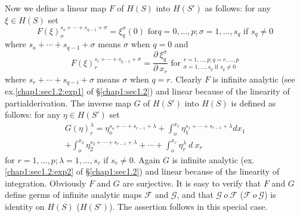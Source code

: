 Now we define a linear map $F$ of $H(S)$ into $H(S')$ as follows: for
any $\xi \in H(S)$ set 
$$
F(\xi)_o^{s_o + \cdots + s_{q-1} + \sigma} = \xi^\sigma_q (0) \text{ for
} q = 0,  \ldots,  p ; \sigma = 1,  \ldots,  s_q \text{ if } s_q \neq
0 
$$
where $s_o + \cdots + s_{q-1} + \sigma$ means $\sigma$ when $q = 0$ and 
$$
F(\xi)^{s_r + \cdots + s_{q-1} + \sigma}_r = \frac{\partial ~
  \xi^\sigma_q}{\partial ~ x_r} \text{ for }^{ r = 1, \ldots,  p; q =
  r,  \ldots,  p}_{\sigma = 1,  \ldots,  s_q \text{ if } s_q \neq 0} 
$$
where $s_r + \cdots + s_{q-i} + \sigma$ means $\sigma$ when $q =
r$. Clearly $F$ is infinite analytic (see ex.\ref{chap1:sec1.2:exp1}
of \S  \ref{chap1:sec1.2}) and
linear because of the linearity of  partial\pageoriginale derivation. The inverse
map $G$ of $H(S')$ into $H(S)$ is defined as follows: for any $\eta
\in H(S')$ set  
\begin{multline*}
  G(\eta)^\lambda_r = \eta_o^{s_o + \cdots + s_{r-1} + \lambda} +
  \int_o^{x_1} \eta_1^{s_1 + \cdots + s_{r-1} + \lambda} dx_1\\ 
  +\int_o^{x_2} \eta^{s_2 + \cdots + s_{r-1} + \lambda}_2 + \cdots +
  \int_o^{x_r} \eta^\lambda_r ~ d ~ x_r 
\end{multline*}
for $r =1,  \ldots,  p; \lambda = 1,  \ldots,  s_r$ if $s_r \neq
0$. Again $G$ is infinite analytic (ex.\ref{chap1:sec1.2:exp2} of
\S  \ref{chap1:sec1.2}) and linear
because of the linearity of integration. Obviously $F$ and $G$ are
surjective. It is easy to verify that $F$ and $G$ define germs of
infinite analytic maps $\mathscr{F}$ and $\mathscr{G}$,  and that
$\mathscr{G} ~o ~ \mathscr{F}$ (\resp  $\mathscr{F} ~ o ~ \mathscr{G}$)
is identity on $H(S)$ (\resp  $H(S')$). The assertion follows in this
special case. 

